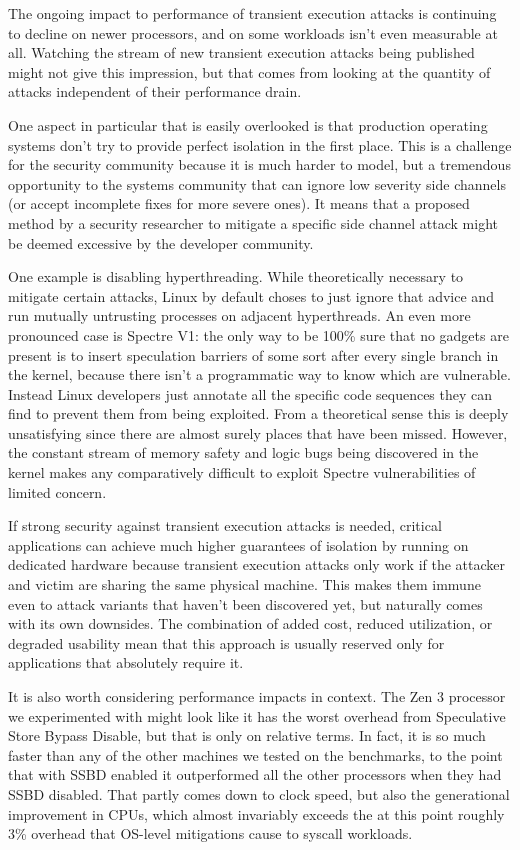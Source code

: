 \label{s:discussion}
The ongoing impact to performance of transient execution attacks is continuing to decline on newer processors, and on some workloads isn't even measurable at all.
Watching the stream of new transient execution attacks being published might not give this impression, but that comes from looking at the quantity of attacks independent of their performance drain.

One aspect in particular that is easily overlooked is that production operating systems don't try to provide perfect isolation in the first place.
This is a challenge for the security community because it is much harder to model, but a tremendous opportunity to the systems community that can ignore low severity side channels (or accept incomplete fixes for more severe ones).
It means that a proposed method by a security researcher to mitigate a specific side channel attack might be deemed excessive by the developer community.

One example is disabling hyperthreading.
While theoretically necessary to mitigate certain attacks, Linux by default choses to just ignore that advice and run mutually untrusting processes on adjacent hyperthreads.
An even more pronounced case is Spectre V1: the only way to be 100\% sure that no gadgets are present is to insert speculation barriers of some sort after every single branch in the kernel, because there isn't a programmatic way to know which are vulnerable.
Instead Linux developers just annotate all the specific code sequences they can find to prevent them from being exploited.
From a theoretical sense this is deeply unsatisfying since there are almost surely places that have been missed.
However, the constant stream of memory safety and logic bugs being discovered in the kernel makes any comparatively difficult to exploit Spectre vulnerabilities of limited concern.

If strong security against transient execution attacks is needed, critical applications can achieve much higher guarantees of isolation by running on dedicated hardware because transient execution attacks only work if the attacker and victim are sharing the same physical machine.
This makes them immune even to attack variants that haven't been discovered yet, but naturally comes with its own downsides.
The combination of added cost, reduced utilization, or degraded usability mean that this approach is usually reserved only for applications that absolutely require it.

It is also worth considering performance impacts in context.
The Zen 3 processor we experimented with might look like it has the worst overhead from Speculative Store Bypass Disable, but that is only on relative terms.
In fact, it is so much faster than any of the other machines we tested on the benchmarks, to the point that with SSBD enabled it outperformed all the other processors when they had SSBD disabled.
That partly comes down to clock speed, but also the generational improvement in CPUs, which almost invariably exceeds the at this point roughly 3\% overhead that OS-level mitigations cause to syscall workloads.

